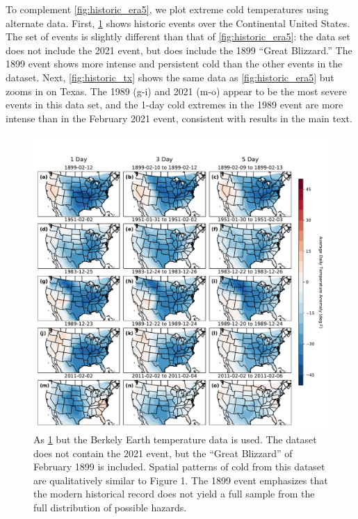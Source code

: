 \documentclass[12pt]{iopart}
\begin{document}
To complement \cref{fig:historic_era5}, we plot extreme cold temperatures using alternate data.
First, \cref{fig:historic_bk} shows historic events over the Continental United States.
The set of events is slightly different than that of \cref{fig:historic_era5}: the data set does not include the 2021 event, but does include the 1899 ``Great Blizzard.''
The 1899 event shows more intense and persistent cold than the other events in the dataset.
Next, \cref{fig:historic_tx} shows the same data as \cref{fig:historic_era5} but zooms in on Texas.
The 1989 (g-i) and 2021 (m-o) appear to be the most severe events in this data set, and the 1-day cold extremes in the 1989 event are more intense than in the February 2021 event, consistent with results in the main text.

\begin{figure}
  \centering
  \includegraphics[width=\textwidth]{historic_events_bk.pdf}
  \caption{
    As \cref{fig:historic_bk} but the Berkely Earth temperature data is used.
    The dataset does not contain the 2021 event, but the ``Great Blizzard'' of February 1899 is included.
    Spatial patterns of cold from this dataset are qualitatively similar to Figure 1.
    The 1899 event emphasizes that the modern historical record does not yield a full sample from the full distribution of possible hazards.
  }\label{fig:historic_bk}
\end{figure}
\end{document}
